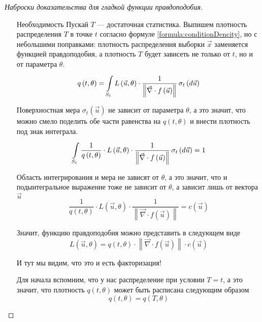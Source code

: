 \begin{proof}[Наброски доказательства для гладкой функции правдоподобия]
\begin{enumerate}
      Условное распределение $\vec{x}$ не зависит от $\theta$
      при известном $T$, что и требовалось доказать для того, чтобы
      показать достаточность факторизации.

      \item[Необходимость]
      Пускай $T$ --- достаточная статистика.
      Выпишем плотность распределения $T$ в точке $t$ согласно формуле
      \eqref{formula:conditionDencity}, но с небольшими поправками:
      плотность распределения выборки $\vec{x}$ заменяется
      функцией правдоподобия, а плотность $T$ будет зависеть не только
      от $t$, но и от параметра $\theta$.
      $$q\left( t, \theta \right)
      = \integrall{S_t}{\sigma_{t}\left(d\vec{u} \right)}{
    L\left( \vec{u}, \theta \right) \cdot \frac{1}{
        \left\| \vec{\nabla}
    \cdot f\left( \vec{u} \right) \right\|}}$$

      Поверхностная мера $\sigma_{t} \left( \vec{u} \right)$ не зависит
      от параметра $\theta$, а это значит, что можно смело поделить
      обе части равенства на $q\left( t, \theta \right)$ и внести
      плотность под знак интеграла.
      $$\integrall{S_t}{\sigma_{t}\left(d\vec{u} \right)}{
      \frac{1}{q\left( t, \theta \right)}
      \cdot L\left( \vec{u}, \theta \right) \cdot \frac{1}{
    \left\| \vec{\nabla}
        \cdot f\left( \vec{u} \right) \right\|}} = 1$$

      Область интегрирования и мера не зависят от $\theta$, а это значит,
      что и подынтегральное выражение тоже не зависит от $\theta$,
      а зависит лишь от вектора $\vec{u}$
      $$\frac{1}{q\left( t, \theta \right)}
      \cdot L\left( \vec{u}, \theta \right) \cdot \frac{1}{
    \left\| \vec{\nabla} \cdot f\left( \vec{u} \right) \right\|}
      = c\left( \vec{u} \right)$$

      Значит, функцию правдоподобия можно представить в следующем виде
      $$L\left( \vec{u}, \theta \right)
      = q\left( t, \theta \right)
    \cdot \left\| \vec{\nabla}
        \cdot f\left( \vec{u} \right) \right\|
        \cdot c\left( \vec{u} \right)$$

      И тут мы видим, что это и есть факторизация!

      Для начала вспомним, что у нас распределение при условии $T=t$,
      а это значит, что плотность $q\left( t, \theta \right)$
      может быть расписана следующим образом
      $$q\left( t, \theta \right)
      = q\left( T, \theta \right)$$


\end{enumerate}
\end{proof}
